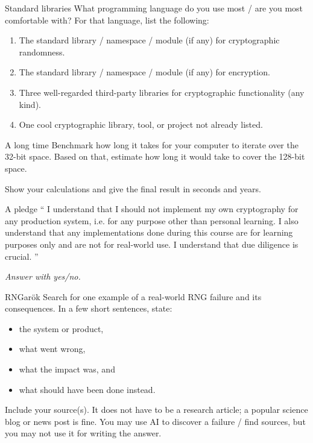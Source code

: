 \documentclass{homework}
\begin{document}
\begin{task}{Standard libraries}
  What programming language do you use most / are you most comfortable with?
  For that language, list the following:
  \begin{enumerate}
    \item The standard library / namespace / module (if any) for cryptographic randomness.
    \item The standard library / namespace / module (if any) for encryption.
    \item Three well-regarded third-party libraries for cryptographic functionality (any kind).
    \item One cool cryptographic library, tool, or project not already listed.
  \end{enumerate}
\end{task}

\begin{task}{A long time}
  Benchmark how long it takes for your computer to iterate over the 32-bit space.
  Based on that, estimate how long it would take to cover the 128-bit space.

  Show your calculations and give the final result in seconds and years.
\end{task}

\begin{task}{A pledge}
  \enquote{%
    I understand that I should not implement my own cryptography for any production system, i.e. for any purpose other than personal learning.
    I also understand that any implementations done during this course are for learning purposes only and are not for real-world use.
    I understand that due diligence is crucial.%
  }

  \textit{Answer with yes/no.}
\end{task}

\newpage

\begin{task}{RNGarök}
  Search for one example of a real-world RNG failure and its consequences.
  In a few short sentences, state:
  \begin{itemize}
    \item the system or product,
    \item what went wrong,
    \item what the impact was, and
    \item what should have been done instead.
  \end{itemize}

  Include your source(s).
  It does not have to be a research article; a popular science blog or news post is fine.
  You may use AI to discover a failure / find sources, but you may not use it for writing the answer.
\end{task}
\end{document}

